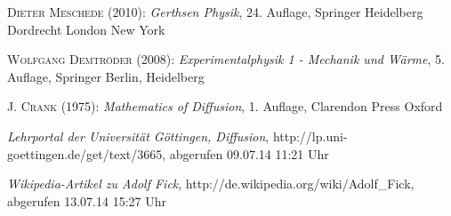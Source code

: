 \documentclass[12pt,a4paper,titlepage,headinclude,bibtotoc]{scrartcl}
\begin{document}
\begin{thebibliography}{100}

	\textsc{Dieter Meschede} (2010): \emph{Gerthsen Physik}, 24. Auflage, Springer Heidelberg
Dordrecht London New York

\textsc{Wolfgang Demtröder} (2008): \emph{Experimentalphysik 1 - Mechanik und Wärme}, 5. Auflage, Springer Berlin, Heidelberg

	\textsc{J. Crank} (1975): \emph{Mathematics of Diffusion}, 1. Auflage, Clarendon Press Oxford

	\emph{Lehrportal der Universität Göttingen, Diffusion},
  http://lp.uni-goettingen.de/get/text/3665, abgerufen 09.07.14 11:21 Uhr
  
	\emph{Wikipedia-Artikel zu Adolf Fick}, http://de.wikipedia.org/wiki/Adolf\_Fick, abgerufen 13.07.14 15:27 Uhr

\end{thebibliography}
\end{document}
